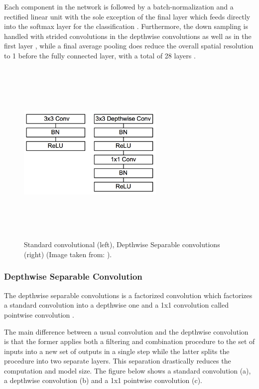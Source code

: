 Each component in the network is followed by a batch-normalization and a rectified linear unit with the sole exception of the final layer which feeds directly into the softmax layer for the classification \cite{paper:MobileNets}. Furthermore, the down sampling is handled with strided convolutions in the depthwise convolutions as well as in the first layer \cite{paper:MobileNets}, while a final average pooling does reduce the overall spatial resolution to 1 before the fully connected layer, with a total of 28 layers \cite{paper:MobileNets}.

\begin{figure}[!htbp]
\begin{center}
\includegraphics[width=7cm,height=9cm,keepaspectratio]{images/mobileNet_contrast.png}
\end{center}
\caption{Standard convolutional (left), Depthwise Separable convolutions (right) (Image taken from: \cite{paper:MobileNets}).}
\end{figure}

\subsubsection{Depthwise Separable Convolution}

The depthwise separable convolutions is a factorized convolution which factorizes a standard convolution into a depthwise one and a 1x1 convolution called pointwise convolution \cite{paper:MobileNets}.

The main difference between a usual convolution and the depthwise convolution is that the former applies both a filtering and combination procedure to the set of inputs into a new set of outputs in a single step \cite{paper:MobileNets} while the latter splits the procedure into two separate layers. This separation drastically reduces the computation and model size. The figure below shows a standard convolution (a), a depthwise convolution (b) and a 1x1 pointwise convolution (c).

